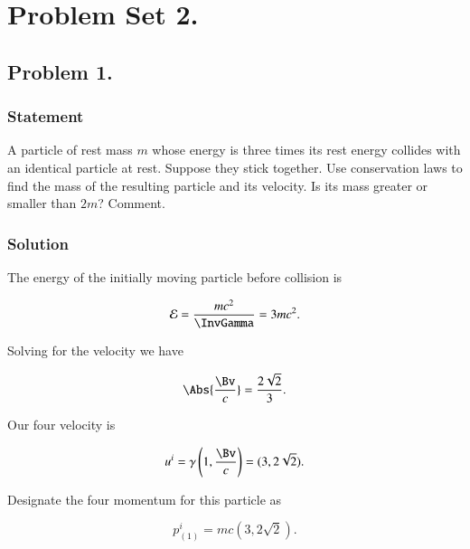 \chapter{Problem Set 2.}
\label{chap:relElectroDynProblemSet2}
\date{Feb 1, 2011}

\beginArtNoToc

\section{Problem 1.}
\subsection{Statement}

A particle of rest mass $m$ whose energy is three times its rest energy collides with an identical particle at rest.  Suppose they stick together.  Use conservation laws to find the mass of the resulting particle and its velocity.  Is its mass greater or smaller than $2m$?  Comment.

\subsection{Solution}

The energy of the initially moving particle before collision is

\begin{equation}\label{eqn:relElectroDynProblemSet2:10}
\mathcal{E} = \frac{m c^2 }{\InvGamma} = 3 m c^2.
\end{equation}

Solving for the velocity we have

\begin{equation}\label{eqn:relElectroDynProblemSet2:30}
\Abs{\frac{\Bv}{c}} = \frac{2 \sqrt{2}}{3}.
\end{equation}

Our four velocity is

\begin{equation}\label{eqn:relElectroDynProblemSet2:50}
u^i
= \gamma \left( 1, \frac{\Bv}{c} \right) = ( 3, 2 \sqrt{2} ).
\end{equation}

Designate the four momentum for this particle as

\begin{equation}\label{eqn:relElectroDynProblemSet2:70}
p_{(1)}^i = m c ( 3, 2 \sqrt{2} ).
\end{equation}

